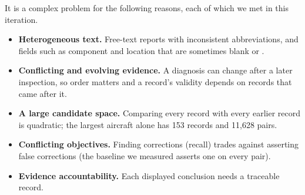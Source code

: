 It is a complex problem for the following reasons, each of which we met in this iteration.
\begin{itemize}
\item \textbf{Heterogeneous text.} Free-text reports with inconsistent abbreviations, and fields such as component and location that are sometimes blank or .
\item \textbf{Conflicting and evolving evidence.} A diagnosis can change after a later inspection, so order matters and a record's validity depends on records that came after it.
\item \textbf{A large candidate space.} Comparing every record with every earlier record is quadratic; the largest aircraft alone has 153 records and 11,628 pairs.
\item \textbf{Conflicting objectives.} Finding corrections (recall) trades against asserting false corrections (the baseline we measured asserts one on every pair).
\item \textbf{Evidence accountability.} Each displayed conclusion needs a traceable record.
\end{itemize}

